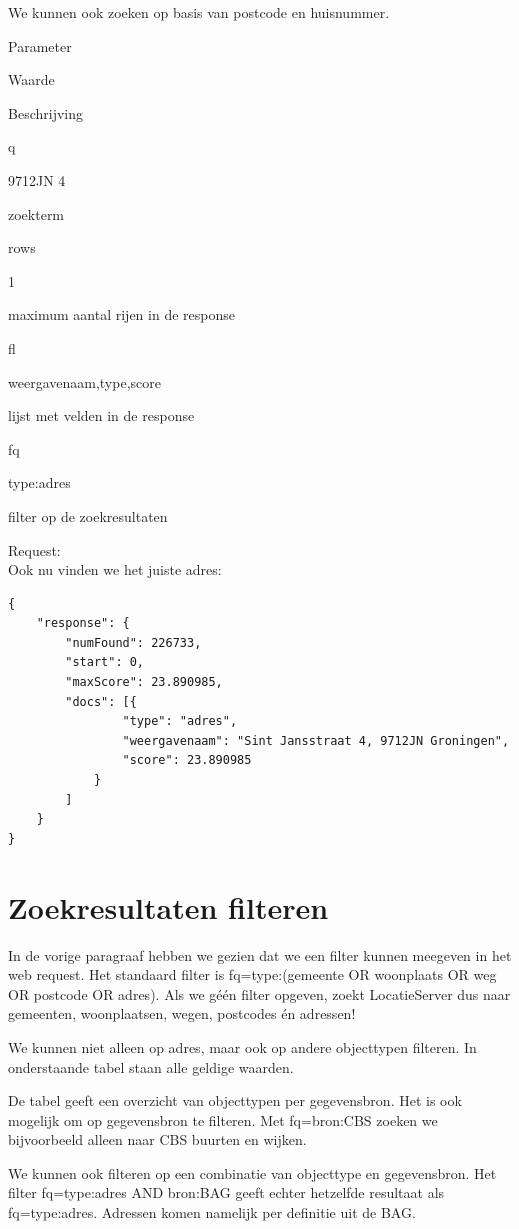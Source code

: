 \documentclass[]{book}
\begin{document}
We kunnen ook zoeken op basis van postcode en huisnummer.

Parameter

Waarde

Beschrijving

{q}

{9712JN 4}

zoekterm

{rows}

{1}

maximum aantal rijen in de response

{fl}

{weergavenaam,type,score}

lijst met velden in de response

{fq}

{type:adres}

filter op de zoekresultaten

Request:\\

Ook nu vinden we het juiste adres:

\begin{verbatim}
{
    "response": {
        "numFound": 226733,
        "start": 0,
        "maxScore": 23.890985,
        "docs": [{
                "type": "adres",
                "weergavenaam": "Sint Jansstraat 4, 9712JN Groningen",
                "score": 23.890985
            }
        ]
    }
}
\end{verbatim}

\hypertarget{zoekresultaten-filteren}{%
\section{Zoekresultaten filteren}\label{zoekresultaten-filteren}}

In de vorige paragraaf hebben we gezien dat we een filter kunnen meegeven in het web request. Het standaard filter is {fq=type:(gemeente OR woonplaats OR weg OR postcode OR adres)}. Als we géén filter opgeven, zoekt LocatieServer dus naar gemeenten, woonplaatsen, wegen, postcodes én adressen!

We kunnen niet alleen op adres, maar ook op andere objecttypen filteren. In onderstaande tabel staan alle geldige waarden.

De tabel geeft een overzicht van objecttypen per gegevensbron. Het is ook mogelijk om op gegevensbron te filteren. Met {fq=bron:CBS} zoeken we bijvoorbeeld alleen naar CBS buurten en wijken.

We kunnen ook filteren op een combinatie van objecttype en gegevensbron. Het filter {fq=type:adres AND bron:BAG} geeft echter hetzelfde resultaat als {fq=type:adres}. Adressen komen namelijk per definitie uit de BAG.
\end{document}
